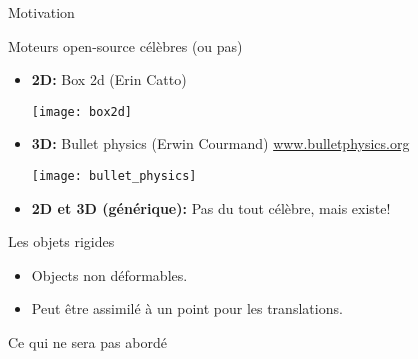 \begin{frame}{Motivation}
    \begin{figure}[h]
        \setcounter{subfigure}{0}
    \end{figure}
\end{frame}

\begin{frame}{Moteurs open-source célèbres (ou pas)}
    \begin{itemize}
        \item \textbf{2D:} Box 2d (Erin Catto)
            \begin{center}
                \texttt{[image: box2d]}
            \end{center}
        \item \textbf{3D:} Bullet physics (Erwin Courmand)
            \href{http://www.bulletphysics.org/Bullet/phpBB3/}{www.bulletphysics.org}
            \begin{center}
                \texttt{[image: bullet\_physics]}
            \end{center}
            \pause
        \item \textbf{2D et 3D (générique):} Pas du tout célèbre, mais existe!
    \end{itemize}
\end{frame}

\begin{frame}{Les objets rigides}
    \begin{itemize}
        \item Objects non déformables.
        \item Peut être assimilé à un point pour les translations.
    \end{itemize}
    \begin{figure}[h]
        \setcounter{subfigure}{0}
    \end{figure}
\end{frame}

\begin{frame}{Ce qui ne sera pas abordé}
    \begin{figure}[h]
        \setcounter{subfigure}{0}
        \pause
        \pause
    \end{figure}
\end{frame}
